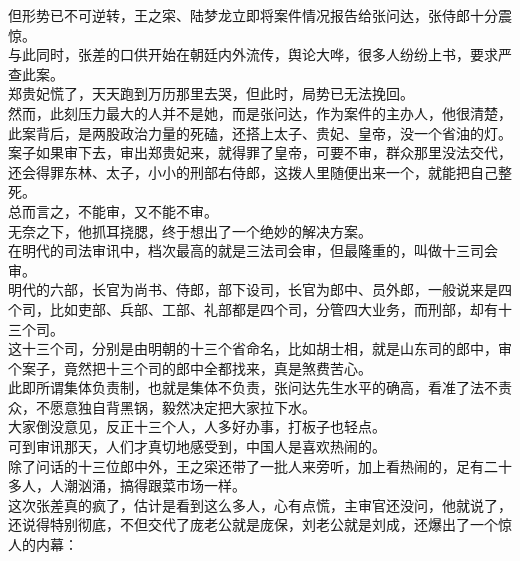 \begin{multicols}{\theparacolNo}
但形势已不可逆转，王之寀、陆梦龙立即将案件情况报告给张问达，张侍郎十分震惊。\\

与此同时，张差的口供开始在朝廷内外流传，舆论大哗，很多人纷纷上书，要求严查此案。\\

郑贵妃慌了，天天跑到万历那里去哭，但此时，局势已无法挽回。\\

然而，此刻压力最大的人并不是她，而是张问达，作为案件的主办人，他很清楚，此案背后，是两股政治力量的死磕，还搭上太子、贵妃、皇帝，没一个省油的灯。\\

案子如果审下去，审出郑贵妃来，就得罪了皇帝，可要不审，群众那里没法交代，还会得罪东林、太子，小小的刑部右侍郎，这拨人里随便出来一个，就能把自己整死。\\

总而言之，不能审，又不能不审。\\

无奈之下，他抓耳挠腮，终于想出了一个绝妙的解决方案。\\

在明代的司法审讯中，档次最高的就是三法司会审，但最隆重的，叫做十三司会审。\\

明代的六部，长官为尚书、侍郎，部下设司，长官为郎中、员外郎，一般说来是四个司，比如吏部、兵部、工部、礼部都是四个司，分管四大业务，而刑部，却有十三个司。\\

这十三个司，分别是由明朝的十三个省命名，比如胡士相，就是山东司的郎中，审个案子，竟然把十三个司的郎中全都找来，真是煞费苦心。\\

此即所谓集体负责制，也就是集体不负责，张问达先生水平的确高，看准了法不责众，不愿意独自背黑锅，毅然决定把大家拉下水。\\

大家倒没意见，反正十三个人，人多好办事，打板子也轻点。\\

可到审讯那天，人们才真切地感受到，中国人是喜欢热闹的。\\

除了问话的十三位郎中外，王之寀还带了一批人来旁听，加上看热闹的，足有二十多人，人潮汹涌，搞得跟菜市场一样。\\

这次张差真的疯了，估计是看到这么多人，心有点慌，主审官还没问，他就说了，还说得特别彻底，不但交代了庞老公就是庞保，刘老公就是刘成，还爆出了一个惊人的内幕：\\


\end{multicols}

